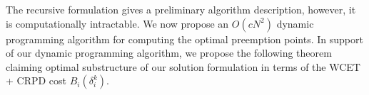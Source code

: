 \noindent
The recursive formulation gives a preliminary algorithm description, however, it is computationally intractable.  We now propose an \begin{math}O(cN^{2})\end{math} dynamic programming algorithm for computing the optimal preemption points.  In support of our dynamic programming algorithm, we propose the following theorem claiming optimal substructure of our solution formulation in terms of the WCET + CRPD cost $B_{i}(\delta_{i}^{k})$.

